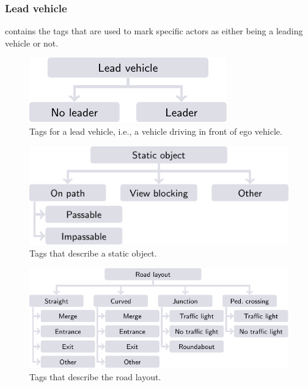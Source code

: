 \documentclass[twoside,twocolumn,9pt]{extarticle}
\theoremstyle{plain}
\begin{document}
\subsubsection{Lead vehicle}
\label{sec:lead vehicle}

 contains the tags that are used to mark specific actors as either being a leading vehicle or not.

\begin{figure}
	\centering
	\includegraphics{lead_vehicle}
	\caption{Tags for a lead vehicle, i.e., a vehicle driving in front of ego vehicle.}
	\label{fig:tree lead vehicle}
\end{figure}

\begin{figure}
	\centering
	\includegraphics{static_object}
	\caption{Tags that describe a static object.}
	\label{fig:tree static object}
\end{figure}



\begin{figure}[t!]
	\centering
	\includegraphics{road_layout}
	\caption{Tags that describe the road layout.}
	\label{fig:tree road layout}
\end{figure}
\end{document}
